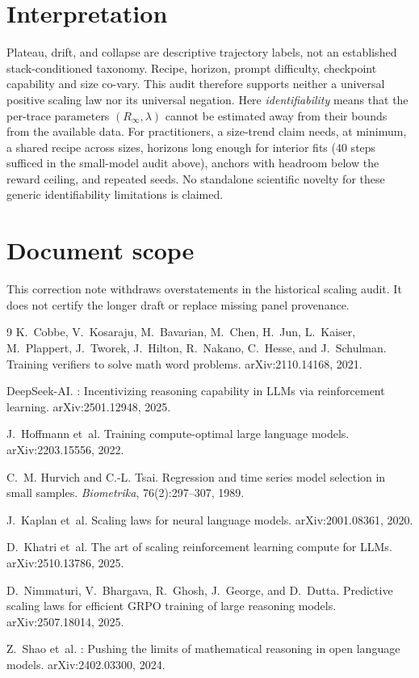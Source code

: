 \documentclass[11pt]{article}
\begin{document}
\section{Interpretation}

Plateau, drift, and collapse are descriptive trajectory labels, not an
established stack-conditioned taxonomy. Recipe, horizon, prompt difficulty,
checkpoint capability and size co-vary. This audit therefore supports neither
a universal positive scaling law nor its universal negation. Here
\emph{identifiability} means that the per-trace parameters $(R_\infty,\lambda)$
cannot be estimated away from their bounds from the available data. For
practitioners, a size-trend claim needs, at minimum, a shared recipe across
sizes, horizons long enough for interior fits (40 steps sufficed in the
small-model audit above), anchors with headroom below the reward ceiling, and
repeated seeds. No standalone scientific novelty for these generic
identifiability limitations is claimed.

\section{Document scope}
This correction note withdraws overstatements in the historical scaling audit.
It does not certify the longer draft or replace missing panel provenance.

\begin{thebibliography}{9}
\small
{}
K.~Cobbe, V.~Kosaraju, M.~Bavarian, M.~Chen, H.~Jun, L.~Kaiser, M.~Plappert,
J.~Tworek, J.~Hilton, R.~Nakano, C.~Hesse, and J.~Schulman.
\newblock Training verifiers to solve math word problems.
\newblock arXiv:2110.14168, 2021.

DeepSeek-AI.
: Incentivizing reasoning capability in {LLMs} via
reinforcement learning.
\newblock arXiv:2501.12948, 2025.

J.~Hoffmann et~al.
\newblock Training compute-optimal large language models.
\newblock arXiv:2203.15556, 2022.

C.~M. Hurvich and C.-L. Tsai.
\newblock Regression and time series model selection in small samples.
\newblock \emph{Biometrika}, 76(2):297--307, 1989.

J.~Kaplan et~al.
\newblock Scaling laws for neural language models.
\newblock arXiv:2001.08361, 2020.

D.~Khatri et~al.
\newblock The art of scaling reinforcement learning compute for {LLMs}.
\newblock arXiv:2510.13786, 2025.

D.~Nimmaturi, V.~Bhargava, R.~Ghosh, J.~George, and D.~Dutta.
\newblock Predictive scaling laws for efficient {GRPO} training of large
reasoning models.
\newblock arXiv:2507.18014, 2025.

Z.~Shao et~al.
: Pushing the limits of mathematical reasoning in open
language models.
\newblock arXiv:2402.03300, 2024.
\end{thebibliography}
\end{document}
